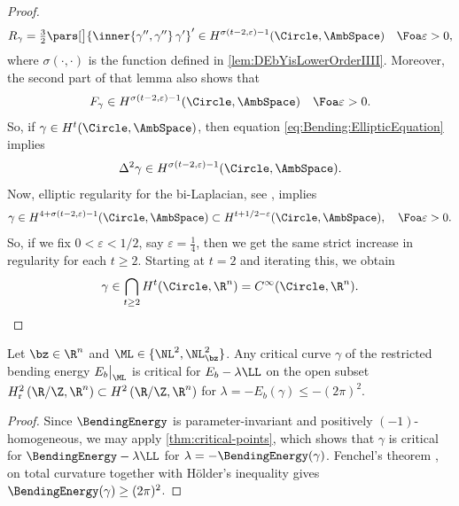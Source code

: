 \begin{proof}
\begin{equation}
\begin{aligned}
        R_\gamma 
        = 
        \tfrac{3}{2}  \pars[\big]{ \inner{\gamma'',\gamma''} \, \gamma'}' \in H^{\sigma(t-2,\varepsilon)-1}(\Circle,\AmbSpace)\quad\Foa\varepsilon>0
        ,
    \end{aligned}
    \end{equation}
    where $\sigma(\cdot,\cdot)$ is the function defined in \cref{lem:DEbYisLowerOrderIIII}.
    Moreover, the second part of that lemma also shows that 
    \begin{equation}\label{eq:95B_vdM}
    \begin{aligned}
        F_\gamma \in H^{\sigma(t-2,\varepsilon)-1}(\Circle,\AmbSpace)\quad\Foa\varepsilon>0
        .
    \end{aligned}
    \end{equation}
    So, if $\gamma \in H^t(\Circle,\AmbSpace)$, then equation \cref{eq:Bending:EllipticEquation} implies 
    \[
        \Delta^2 \gamma \in 
        H^{\sigma(t-2,\varepsilon)-1}(\Circle,\AmbSpace).
    \]
    Now, elliptic regularity for the bi-Laplacian, see \cite[Theorem 6.33]{folland_1995}, implies
    \[
        \gamma \in 
        H^{4 + \sigma(t-2,\varepsilon)-1}(\Circle,\AmbSpace)
        \subset 
        H^{t+1/2 - \varepsilon}(\Circle,\AmbSpace), \quad\Foa\varepsilon>0.
    \]
    So, if we fix $0 < \varepsilon <1/2$, say $ \varepsilon=\frac{1}{4} $, then we get the same strict increase in regularity for each $t \geq 2$.
    Starting at $t = 2$ and iterating this, we obtain
    \[
        \gamma \in \bigcap_{t \geq 2} H^{t}(\Circle,\R^n) = C^\infty(\Circle,\R^n).
    \]
\end{proof}
 
\begin{corollary}
    Let $ \bz\in \R^n $ and $ \ML\in\{\NL^2,\NL^2_{\bz}\} $.
    Any critical curve $ \gamma $ of the restricted bending energy $ E_b\big\vert_{\ML} $ is critical for $ E_b-\lambda\LL $ on the open subset $ H^2_{\mathrm{r}}\left( \R/\Z,\R^n \right)\subset H^2\left( \R/\Z,\R^n \right)$ for $ \lambda=-E_b(\gamma)\le-(2\pi)^2 $. 
\end{corollary}
\begin{proof}
    Since $ \BendingEnergy $ is parameter-invariant and positively $ (-1) $-homogeneous, we may apply \cref{thm:critical-points}, which shows that $ \gamma $ is critical for $ \BendingEnergy-\lambda\LL $ for $ \lambda=-\BendingEnergy(\gamma) $. Fenchel's theorem \cite[Theorem 3, p. 405]{CarmoDifferentialGeometryCurves2016}, on total curvature together with Hölder's inequality gives $ \BendingEnergy(\gamma)\ge (2\pi)^2 $.
\end{proof}

